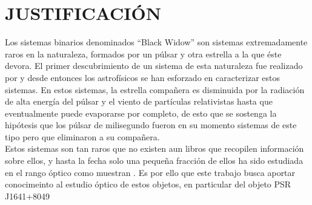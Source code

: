 \chapter{JUSTIFICACIÓN}

Los sistemas binarios  denominados ``Black Widow'' son sistemas extremadamente raros en la naturaleza, formados por un p\'ulsar y otra estrella a la que \'este devora. El primer descubrimiento de un sistema de esta naturaleza fue realizado por \citet{fruchter1988} y desde entonces los astrofísicos se han esforzado en caracterizar estos sistemas. En estos sistemas, la estrella compañera es disminuida por la radiación de alta energía del púlsar y el viento de partículas relativistas hasta que eventualmente puede evaporarse por completo, de esto que se sostenga la hipótesis que los p\'ulsar de milisegundo fueron en su momento sistemas de este tipo pero que eliminaron a su compa\~nera.\\



Estos sistemas son tan raros que no existen aun libros que recopilen información sobre ellos, y hasta la fecha solo una peque\~na fracción de ellos ha sido estudiada en el rango óptico como muestran \citet{Zharikov2019}. Es por ello que este trabajo busca aportar conocimeinto al estudio óptico de estos objetos, en particular del objeto PSR J1641+8049  


